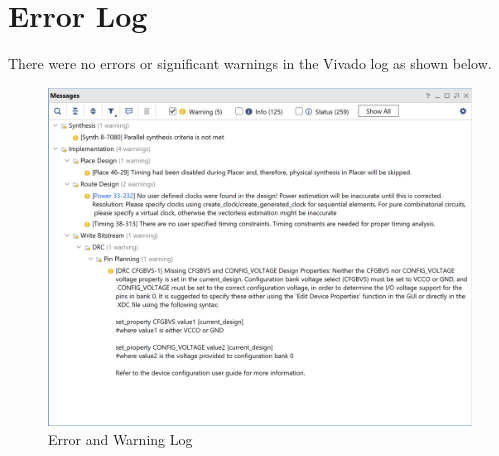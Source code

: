 \documentclass[12pt]{article}
\begin{document}
\newpage

\section{Error Log}

There were no errors or significant warnings in the Vivado log as shown below.

\begin{figure}[h]
    \centering
    \includegraphics[width=.8\textwidth]{Figures/CPE 133 Lab 3 Error Log.png}
    \caption{Error and Warning Log}
    \label{fig:warninglog}
\end{figure}
\end{document}

